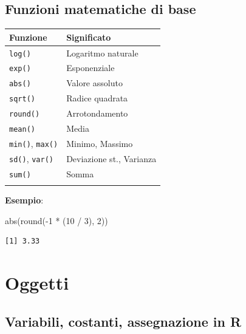 \documentclass[
  ignorenonframetext,
  compress, aspectratio=149]{beamer}
\newenvironment{Shaded}{}{}
\newcommand{\DecValTok}[1]{\textcolor[rgb]{0.69,0.50,0.00}{#1}}
\newcommand{\FunctionTok}[1]{\textcolor[rgb]{0.39,0.29,0.61}{#1}}
\newcommand{\NormalTok}[1]{\textcolor[rgb]{0.12,0.11,0.11}{#1}}
\newcommand{\SpecialCharTok}[1]{\textcolor[rgb]{0.24,0.68,0.91}{#1}}
\begin{document}
\subsection{Funzioni matematiche di
base}\label{funzioni-matematiche-di-base}

\begin{frame}[fragile]{}
\label{section-8}
\begin{longtable}[]{@{}ll@{}}
\toprule\noalign{}
Funzione & Significato \\
\midrule\noalign{}
\endhead
\texttt{log()} & Logaritmo naturale \\
\texttt{exp()} & Esponenziale \\
\texttt{abs()} & Valore assoluto \\
\texttt{sqrt()} & Radice quadrata \\
\texttt{round()} & Arrotondamento \\
\texttt{mean()} & Media \\
\texttt{min()}, \texttt{max()} & Minimo, Massimo \\
\texttt{sd()}, \texttt{var()} & Deviazione st., Varianza \\
\texttt{sum()} & Somma \\
\bottomrule\noalign{}
\end{longtable}

\textbf{Esempio}:

\begin{Shaded}
\begin{Highlighting}[]
\FunctionTok{abs}\NormalTok{(}\FunctionTok{round}\NormalTok{(}\SpecialCharTok{{-}}\DecValTok{1} \SpecialCharTok{*}\NormalTok{ (}\DecValTok{10} \SpecialCharTok{/} \DecValTok{3}\NormalTok{), }\DecValTok{2}\NormalTok{))}
\end{Highlighting}
\end{Shaded}

\begin{verbatim}
[1] 3.33
\end{verbatim}
\end{frame}

\section{Oggetti}\label{oggetti}

\subsection{Variabili, costanti, assegnazione in
R}\label{variabili-costanti-assegnazione-in-r}
\end{document}
